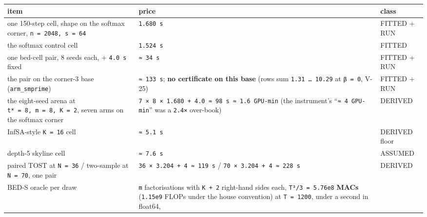 \documentclass[11pt,a4paper]{article}
\newcounter{none}                 %
\theoremstyle{plain}
\theoremstyle{definition}
\theoremstyle{remark}
\begin{document}
\begin{enumerate}
  {\def\LTcaptype{none} %
  \begin{longtable}[]{@{}
    >{\raggedright\arraybackslash}p{}
    >{\raggedright\arraybackslash}p{}
    >{\raggedright\arraybackslash}p{}@{}}
  \toprule\noalign{}
  \begin{minipage}[b]{\linewidth}\raggedright
  item
  \end{minipage} & \begin{minipage}[b]{\linewidth}\raggedright
  price
  \end{minipage} & \begin{minipage}[b]{\linewidth}\raggedright
  class
  \end{minipage} \\
  \midrule\noalign{}
  \endhead
  \bottomrule\noalign{}
  \endlastfoot
  one 150-step cell, shape on the softmax corner,
  \texttt{n\ =\ 2048,\ s\ =\ 64} & \texttt{1.680\ s} & FITTED + RUN \\
  the softmax control cell & \texttt{1.524\ s} & FITTED \\
  one bed-cell pair, 8 seeds each, + \texttt{4.0\ s} fixed &
  \texttt{≈\ 34\ s} & FITTED + RUN \\
  the pair on the corner-3 base (\texttt{arm\_smprime}) &
  \texttt{≈\ 133\ s}; \textbf{no certificate on this base} (rows sum
  \texttt{1.31\ …\ 10.29} at \texttt{β\ =\ 0}, V-25) & FITTED + RUN \\
  the eight-seed arena at \texttt{t*\ =\ 8,\ m\ =\ 8,\ K\ =\ 2}, seven
  arms on the softmax corner &
  \texttt{7\ ×\ 8\ ×\ 1.680\ +\ 4.0\ ≈\ 98\ s\ ≈\ 1.6\ GPU-min} (the
  instrument's ``\texttt{≈\ 4\ GPU-min}'' was a \texttt{2.4×} over-book)
  & DERIVED \\
  InfSA-style \texttt{K\ =\ 16} cell & \texttt{≈\ 5.1\ s} & DERIVED
  floor \\
  depth-5 skyline cell & \texttt{≈\ 7.6\ s} & ASSUMED \\
  paired TOST at \texttt{N\ =\ 36} / two-sample at \texttt{N\ =\ 70},
  one pair & \texttt{36\ ×\ 3.204\ +\ 4\ ≈\ 119\ s} /
  \texttt{70\ ×\ 3.204\ +\ 4\ ≈\ 228\ s} & DERIVED \\
  BED-S oracle per draw & \texttt{m} factorisations with
  \texttt{K\ +\ 2} right-hand sides each,
  \texttt{\textbar{}T\textbar{}³/3\ =\ 5.76e8} \textbf{MACs}
  (\texttt{1.15e9} FLOPs under the house convention) at
  \texttt{\textbar{}T\textbar{}\ =\ 1200}, under a second in float64,

\end{longtable}}
\end{enumerate}
\end{document}
